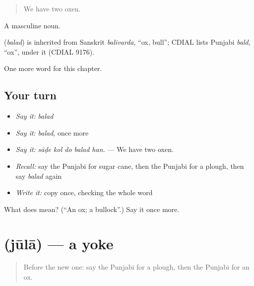 \begin{quote}
We have two oxen.
\end{quote}

A masculine noun.

\begin{cousinweb}
\textbf{} (\emph{balad}) is inherited from Sanskrit \emph{balivarda}, \textquotedblleft{}ox, bull\textquotedblright{}; CDIAL lists Punjabi \emph{bald}, \textquotedblleft{}ox\textquotedblright{}, under it (CDIAL 9176).
\end{cousinweb}

\begin{grammarlens}[title={What you've built}]
One more word for this chapter.
\end{grammarlens}

\subsection*{Your turn}
\begin{itemize}
\raggedright
  \item \emph{Say it:} \emph{balad}
  \item \emph{Say it:} \emph{balad}, once more
  \item \emph{Say it:} \emph{sāḍe kol do balad han.} — We have two oxen.
  \item \emph{Recall:} say the Punjabi for sugar cane, then the Punjabi for a plough, then say \emph{balad} again
  \item \emph{Write it:} copy \textbf{} once, checking the whole word
\end{itemize}

\begin{tcolorbox}[breakable,colback=teal!4,colframe=teal!35!black,title={Before you move on}]
What does  mean? (\textquotedblleft{}An ox; a bullock\textquotedblright{}.) Say it once more.
\end{tcolorbox}
\section[\texorpdfstring{\pa{ਜੂਲਾ} (jūlā)}{ਜੂਲਾ (jūlā)}]{ (jūlā) — a yoke}

\label{lesson:PA-C301-jula}



\begin{quote}
Before the new one: say the Punjabi for a plough, then the Punjabi for an ox.
\end{quote}

